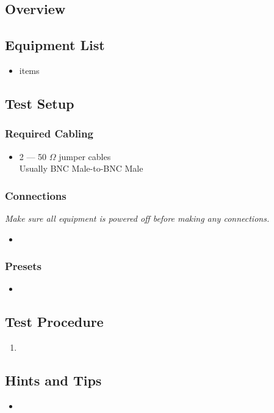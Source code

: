 \documentclass[10pt,letterpaper]{book}
\begin{document}
\subsection*{Overview}
\subsection*{Equipment List}
\begin{itemize}
	\item items
\end{itemize}
\subsection*{Test Setup}
\subsubsection*{Required Cabling}
\begin{itemize}
	\item 2 --- 50 $\Omega$ jumper cables \\
		Usually BNC Male-to-BNC Male
\end{itemize}
\subsubsection*{Connections}
\emph{Make sure all equipment is powered off before making any connections.}
\begin{itemize}
	\item
\end{itemize}
\subsubsection*{Presets}
\begin{itemize}
	\item
\end{itemize}
\subsection*{Test Procedure}
\begin{enumerate}
	\item  
\end{enumerate}

\subsection*{Hints and Tips}
\begin{itemize}
	\item
\end{itemize}
\newpage
\end{document}
